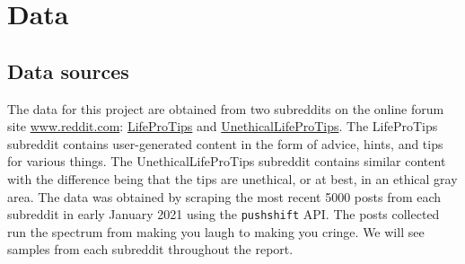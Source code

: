 \documentclass{amsart}
\theoremstyle{definition}
\theoremstyle{remark}
\newcommand{\tql}{\textquotedblleft}
\newcommand{\tqr}{\textquotedblright}
\newcommand{\noin}{\noindent}
\begin{document}
\section{Data}\label{data}

\subsection{Data sources}

The data for this project are obtained from two subreddits on the online forum site \href{https://www.reddit.com/}{www.reddit.com}: \href{https://www.reddit.com/r/LifeProTips/}{LifeProTips}  and \href{https://www.reddit.com/r/UnethicalLifeProTips/}{UnethicalLifeProTips}.  The LifeProTips subreddit contains user-generated content in the form of advice, hints, and tips for various things.  The UnethicalLifeProTips subreddit contains similar content with the difference being that the tips are unethical, or at best, in an ethical gray area.  The data was obtained by scraping the most recent 5000 posts from each subreddit in early January 2021 using the \texttt{pushshift} API. The posts collected run the spectrum from making you laugh to making you cringe. 
%
%
%
%
%
%
%
%
%
%
%
We will see samples from each subreddit throughout the report.
\end{document}
